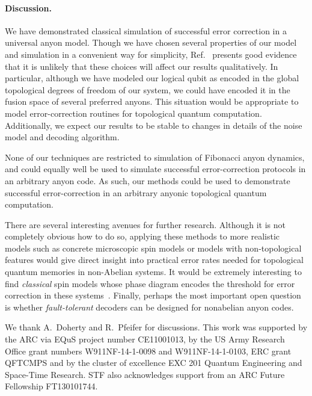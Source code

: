 \documentclass[aps, prl, letterpaper, twocolumn, superscriptaddress, notitlepage, 10pt]{revtex4-1}
\begin{document}
\paragraph{Discussion.}

We have demonstrated classical simulation of successful error correction in a universal anyon model. 
Though we have chosen several properties of our model and 
simulation in a convenient way for simplicity,
Ref.~\cite{Brell2013} presents good evidence that it is
unlikely that these choices will affect our results qualitatively.
In particular, although we have modeled our logical qubit as 
encoded in the global topological degrees of freedom of our 
system, we could have encoded it in the fusion space of several preferred anyons. 
This situation would be appropriate to model error-correction routines for topological quantum computation. 
Additionally, we expect our results to be stable to changes in details of the noise model and decoding algorithm.

None of our techniques are restricted to simulation of Fibonacci anyon dynamics, and could 
equally well be used to simulate successful error-correction protocols in an arbitrary anyon code. 
As such, our methods could be used to demonstrate successful 
error-correction in an arbitrary anyonic topological quantum computation.

There are several interesting avenues for further research. 
Although it is not completely obvious how to do so, 
applying these methods to more realistic models such as concrete 
microscopic spin models or models with non-topological features would give 
direct insight into practical error rates needed for topological quantum memories in non-Abelian systems. 
It would be extremely interesting to find \emph{classical} spin models 
whose phase diagram encodes the threshold for error correction in these systems~\cite{Dennis2002}.
Finally, perhaps the most important open question is whether 
\emph{fault-tolerant} decoders can be designed for nonabelian anyon codes. 


\acknowledgments 

We thank A.\ Doherty and R.\ Pfeifer for discussions. 
This work was supported by the ARC via EQuS project number CE11001013, by the US Army Research Office grant numbers W911NF-14-1-0098 and W911NF-14-1-0103, ERC grant QFTCMPS and by the cluster of excellence EXC 201 Quantum Engineering and Space-Time Research. STF also acknowledges support from an ARC Future Fellowship FT130101744.


\end{document}
